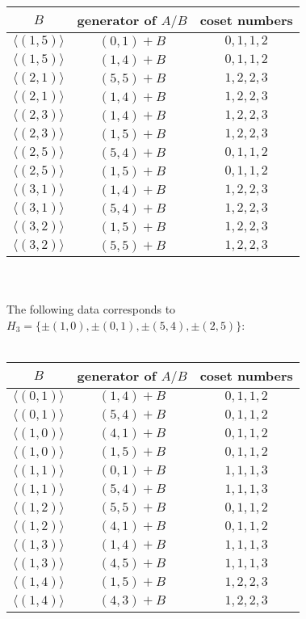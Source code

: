 \documentclass[article,dvisp]{amsart}
\theoremstyle{definition}
\theoremstyle{remark}
\numberwithin{equation}{section}
\theoremstyle{lemma}
\begin{document}
\begin{tabular}{|c|c|c|}
\hline
$B$&generator of $A/B$&coset numbers\\
\hline
$\langle(1,5)\rangle$&$(0,1)+B$&$0,1,1,2$\\
\hline
$\langle(1,5)\rangle$&$(1,4)+B$&$0,1,1,2$\\
\hline
$\langle(2,1)\rangle$&$(5,5)+B$&$1,2,2,3$\\
\hline
$\langle(2,1)\rangle$&$(1,4)+B$&$1,2,2,3$\\
\hline
$\langle(2,3)\rangle$&$(1,4)+B$&$1,2,2,3$\\
\hline
$\langle(2,3)\rangle$&$(1,5)+B$&$1,2,2,3$\\
\hline
$\langle(2,5)\rangle$&$(5,4)+B$&$0,1,1,2$\\
\hline
$\langle(2,5)\rangle$&$(1,5)+B$&$0,1,1,2$\\
\hline
$\langle(3,1)\rangle$&$(1,4)+B$&$1,2,2,3$\\
\hline
$\langle(3,1)\rangle$&$(5,4)+B$&$1,2,2,3$\\
\hline
$\langle(3,2)\rangle$&$(1,5)+B$&$1,2,2,3$\\
\hline
$\langle(3,2)\rangle$&$(5,5)+B$&$1,2,2,3$\\
\hline
\end{tabular}\vspace{.2in}\\
\\
The following data corresponds to $H_{3}=\{\pm(1,0),\pm(0,1),\pm(5,4),\pm(2,5)\}$:\\
\\
\begin{tabular}{|c|c|c|}
\hline
$B$&generator of $A/B$&coset numbers\\
\hline
$\langle(0,1)\rangle$&$(1,4)+B$&$0,1,1,2$\\
\hline
$\langle(0,1)\rangle$&$(5,4)+B$&$0,1,1,2$\\
\hline
$\langle(1,0)\rangle$&$(4,1)+B$&$0,1,1,2$\\
\hline
$\langle(1,0)\rangle$&$(1,5)+B$&$0,1,1,2$\\
\hline
$\langle(1,1)\rangle$&$(0,1)+B$&$1,1,1,3$\\
\hline
$\langle(1,1)\rangle$&$(5,4)+B$&$1,1,1,3$\\
\hline
$\langle(1,2)\rangle$&$(5,5)+B$&$0,1,1,2$\\
\hline
$\langle(1,2)\rangle$&$(4,1)+B$&$0,1,1,2$\\
\hline
$\langle(1,3)\rangle$&$(1,4)+B$&$1,1,1,3$\\
\hline
$\langle(1,3)\rangle$&$(4,5)+B$&$1,1,1,3$\\
\hline
$\langle(1,4)\rangle$&$(1,5)+B$&$1,2,2,3$\\
\hline
$\langle(1,4)\rangle$&$(4,3)+B$&$1,2,2,3$\\
\hline
\end{tabular}
\end{document}
